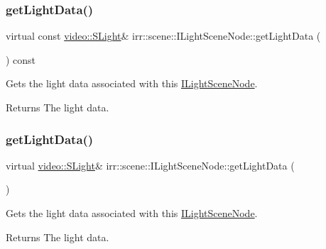 \subsubsection{\texorpdfstring{get\+Light\+Data()}{getLightData()}\hspace{0.1cm}{\footnotesize\ttfamily [2/4]}}
{\footnotesize\ttfamily virtual const \hyperlink{structirr_1_1video_1_1SLight}{video\+::\+S\+Light}\& irr\+::scene\+::\+I\+Light\+Scene\+Node\+::get\+Light\+Data (\begin{DoxyParamCaption}{ }\end{DoxyParamCaption}) const\hspace{0.3cm}{\ttfamily [pure virtual]}}



Gets the light data associated with this \hyperlink{classirr_1_1scene_1_1ILightSceneNode}{I\+Light\+Scene\+Node}. 

\begin{DoxyReturn}{Returns}
The light data. 
\end{DoxyReturn}
\mbox{\label{classirr_1_1scene_1_1ILightSceneNode_a20147e049be1a4790346fd72b150b30c}} 
\subsubsection{\texorpdfstring{get\+Light\+Data()}{getLightData()}\hspace{0.1cm}{\footnotesize\ttfamily [3/4]}}
{\footnotesize\ttfamily virtual \hyperlink{structirr_1_1video_1_1SLight}{video\+::\+S\+Light}\& irr\+::scene\+::\+I\+Light\+Scene\+Node\+::get\+Light\+Data (\begin{DoxyParamCaption}{ }\end{DoxyParamCaption})\hspace{0.3cm}{\ttfamily [pure virtual]}}



Gets the light data associated with this \hyperlink{classirr_1_1scene_1_1ILightSceneNode}{I\+Light\+Scene\+Node}. 

\begin{DoxyReturn}{Returns}
The light data. 
\end{DoxyReturn}
\mbox{\label{classirr_1_1scene_1_1ILightSceneNode_a20147e049be1a4790346fd72b150b30c}} 
